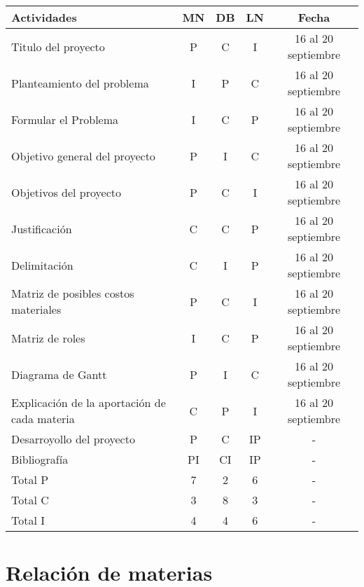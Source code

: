 \documentclass[letter,operight,12pt,spanish]{report}
\begin{document}
\begin{center}
\begin{tabular}{|l|c|c|c|c|}
\hline
	\textbf{Actividades} & \textbf{MN} & \textbf{DB} & \textbf{LN} & \textbf{Fecha}\\
\hline
	Titulo del proyecto & P & C & I & 16 al 20 septiembre\\
\hline
	Planteamiento del problema & I & P & C & 16 al 20 septiembre\\
\hline
	Formular el Problema & I & C & P & 16 al 20 septiembre\\
\hline
	Objetivo general del proyecto & P & I & C & 16 al 20 septiembre\\
\hline
	Objetivos del proyecto & P & C & I & 16 al 20 septiembre\\
\hline
	Justificaci\'on & C & C & P & 16 al 20 septiembre\\
\hline
	Delimitaci\'on & C & I & P & 16 al 20 septiembre\\
\hline
	Matriz de posibles costos materiales & P & C & I & 16 al 20 septiembre\\
\hline
	Matriz de roles & I & C & P & 16 al 20 septiembre\\
\hline
	Diagrama de Gantt & P & I & C & 16 al 20 septiembre\\
\hline
	Explicaci\'on de la aportaci\'on de cada materia & C & P & I & 16 al 20 septiembre\\
\hline
	Desarroyollo del proyecto & P & C & IP & -\\
\hline
	Bibliograf\'ia & PI & CI & IP & -\\
\hline
	Total P & 7 & 2 & 6 & -\\
\hline
	Total C & 3 & 8 & 3 & -\\
\hline
	Total I & 4 & 4 & 6 & -\\
\hline
\end{tabular}
\end{center}

\section{Relaci\'on de materias}
\end{document}
